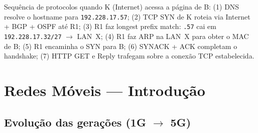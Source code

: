 \documentclass[11pt,a4paper]{article}
\begin{document}
\begin{pratico}
Sequência de protocolos quando K (Internet) acessa a página de B: (1) DNS resolve o hostname para \texttt{192.228.17.57}; (2) TCP SYN de K roteia via Internet + BGP + OSPF até R1; (3) R1 faz longest prefix match: \texttt{.57} cai em \texttt{192.228.17.32/27} $\to$ LAN~X; (4) R1 faz ARP na LAN~X para obter o MAC de B; (5) R1 encaminha o SYN para B; (6) SYNACK + ACK completam o handshake; (7) HTTP GET e Reply trafegam sobre a conexão TCP estabelecida.
\end{pratico}

\hrulefill

\section{Redes Móveis --- Introdução}

\subsection{Evolução das gerações (1G $\to$ 5G)}
\end{document}
